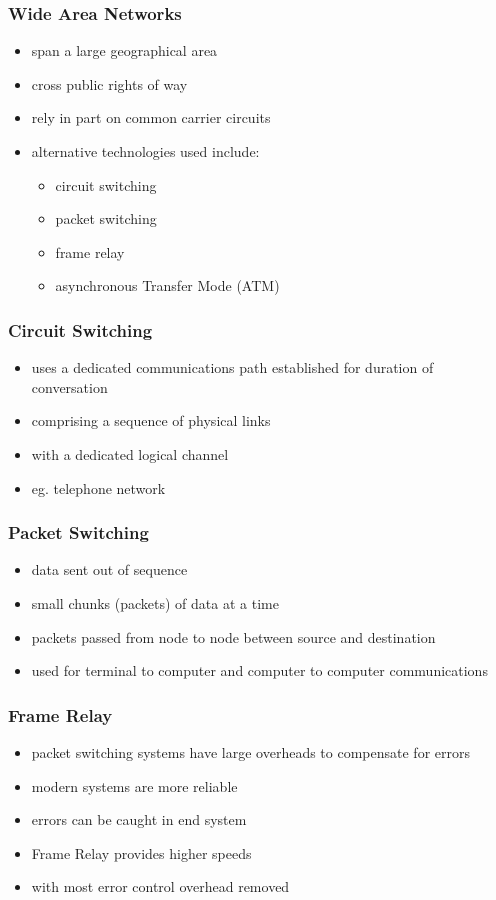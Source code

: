 \documentclass[pdflatex,compress]{beamer}
\begin{document}
\begin{frame}
	\frametitle{Wide Area Networks}
	\begin{itemize}
		\item span a large geographical area
		\item cross public rights of way
		\item rely in part on common carrier circuits
		\item alternative technologies used include:
		\begin{itemize}
			\item circuit switching
			\item packet switching
			\item frame relay
			\item asynchronous Transfer Mode (ATM)
		\end{itemize}
	\end{itemize}
\end{frame}

\begin{frame}
	\frametitle{Circuit Switching}
	\begin{itemize}
		\item uses a dedicated communications path established for duration of conversation
		\item comprising a sequence of physical links
		\item with a dedicated logical channel
		\item eg. telephone network
	\end{itemize}
\end{frame}

\begin{frame}
	\frametitle{Packet Switching}
	\begin{itemize}
		\item data sent out of sequence
		\item small chunks (packets) of data at a time
		\item packets passed from node to node between source and destination
		\item used for terminal to computer and computer to computer communications
	\end{itemize}
\end{frame}

\begin{frame}
	\frametitle{Frame Relay}
	\begin{itemize}
		\item packet switching systems have large overheads to compensate for errors
		\item modern systems are more reliable
		\item errors can be caught in end system
		\item Frame Relay provides higher speeds
		\item with most error control overhead removed
	\end{itemize}
\end{frame}
\end{document}
